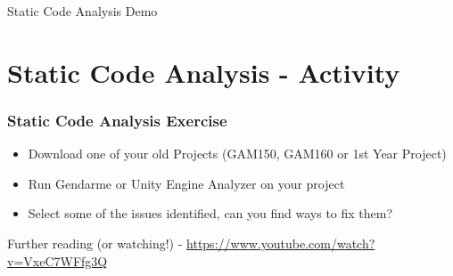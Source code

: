 
\begin{frame}
	\begin{center}
		Static Code Analysis Demo
	\end{center}
\end{frame}

\section{Static Code Analysis - Activity}

\begin{frame}
	\frametitle{Static Code Analysis Exercise}
	\begin{itemize}
		\item Download one of your old Projects (GAM150, GAM160 or 1st Year Project)
		\item Run Gendarme or Unity Engine Analyzer on your project
		\item Select some of the issues identified, can you find ways to fix them?
	\end{itemize}
\end{frame}

\begin{frame}
	\begin{center} 
		Further reading (or watching!) - \url{https://www.youtube.com/watch?v=VxeC7WFfg3Q}
	\end{center}
\end{frame}
